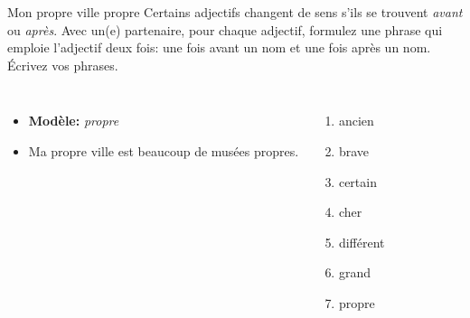 \begin{frame}{Mon propre ville propre}
  Certains adjectifs changent de sens s'ils se trouvent \emph{avant} ou \emph{après}.
  Avec un(e) partenaire, pour chaque adjectif, formulez une phrase qui emploie l'adjectif deux fois: une fois avant un nom et une fois après un nom.
  Écrivez vos phrases.
  \begin{columns}
      \begin{itemize}
        \item[] \textbf{Modèle:} \emph{propre}
        \item Ma propre ville est beaucoup de musées propres.
      \end{itemize}
      \begin{enumerate}
        \item ancien
        \item brave
        \item certain
        \item cher
        \item différent
        \item grand
        \item propre
      \end{enumerate}
  \end{columns}
\end{frame}